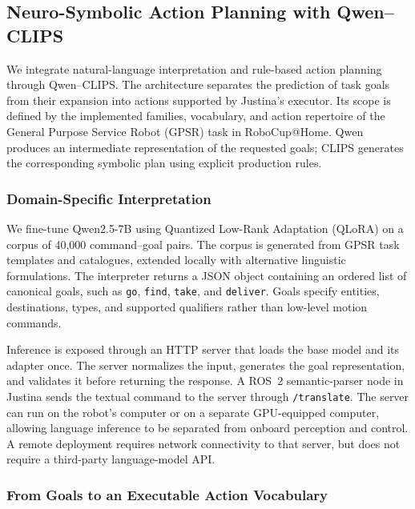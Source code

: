 \subsection{Neuro-Symbolic Action Planning with Qwen--CLIPS}
\label{sub:clips}

We integrate natural-language interpretation and rule-based action planning through Qwen--CLIPS. The architecture separates the prediction of task goals from their expansion into actions supported by Justina's executor. Its scope is defined by the implemented families, vocabulary, and action repertoire of the General Purpose Service Robot (GPSR) task in RoboCup@Home. Qwen produces an intermediate representation of the requested goals; CLIPS generates the corresponding symbolic plan using explicit production rules.

\subsubsection{Domain-Specific Interpretation}

We fine-tune Qwen2.5-7B using Quantized Low-Rank Adaptation (QLoRA) on a corpus of 40,000 command--goal pairs. The corpus is generated from GPSR task templates and catalogues, extended locally with alternative linguistic formulations. The interpreter returns a JSON object containing an ordered list of canonical goals, such as \texttt{go}, \texttt{find}, \texttt{take}, and \texttt{deliver}. Goals specify entities, destinations, types, and supported qualifiers rather than low-level motion commands.

Inference is exposed through an HTTP server that loads the base model and its adapter once. The server normalizes the input, generates the goal representation, and validates it before returning the response. A ROS~2 semantic-parser node in Justina sends the textual command to the server through \texttt{/translate}. The server can run on the robot's computer or on a separate GPU-equipped computer, allowing language inference to be separated from onboard perception and control. A remote deployment requires network connectivity to that server, but does not require a third-party language-model API.

\subsubsection{From Goals to an Executable Action Vocabulary}

